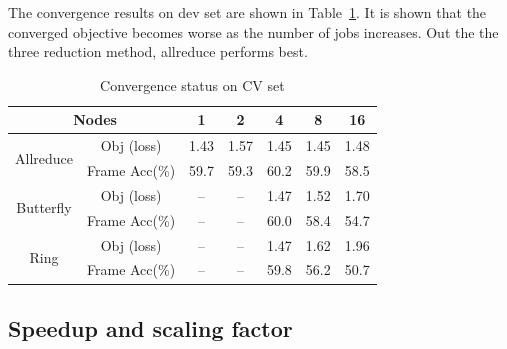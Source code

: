 \documentclass{article}
\begin{document}
The convergence results on dev set are shown in Table~\ref{tab:converge}. It is shown that 
the converged objective becomes worse as the number of jobs increases. Out the the three
reduction method, allreduce performs best.
\begin{table}
  \centering
  \begin{tabular}{c|c|c|c|c|c|c}
    \hline
           \multicolumn{2}{c|}{Nodes}         & 1    & 2    & 4    & 8    & 16 \\
    \hline
\multirow{2}{*}{Allreduce} &    Obj (loss)    & 1.43 & 1.57 & 1.45 & 1.45 & 1.48\\
                           &    Frame Acc(\%) & 59.7 & 59.3 & 60.2 & 59.9 & 58.5\\
    \hline
\multirow{2}{*}{Butterfly} &    Obj (loss)    & --   & --   & 1.47 & 1.52 & 1.70\\
                           &    Frame Acc(\%) & --   & --   & 60.0 & 58.4 & 54.7 \\
    \hline
\multirow{2}{*}{Ring}      &    Obj (loss)    & --   & --   & 1.47 & 1.62 & 1.96\\
                           &    Frame Acc(\%) & --   & --   & 59.8 & 56.2 & 50.7 \\
    \hline
  \end{tabular}
  \caption{Convergence status on CV set}
  \label{tab:converge}
\end{table}

\subsection{Speedup and scaling factor}
\end{document}
